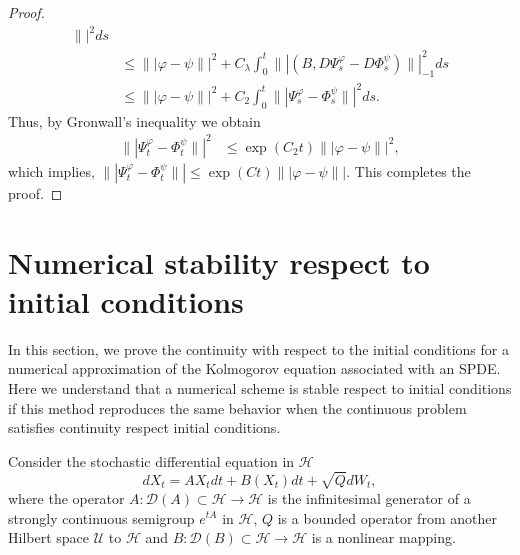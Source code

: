 \documentclass[]{interact}
\theoremstyle{plain}%
\theoremstyle{definition}
\theoremstyle{remark}
\begin{document}
\begin{proof}
\begin{align*}
            \| |^2ds
            \\
            &\le  
            \||
                \varphi - \psi
            \||^2
            + C_\lambda
            \int_0^t  
            \||
                (B,D\Psi_s^\varphi-D\Phi_s^\psi) 
            \||_{-1}^2 ds
        \\
            &\le  
            \||\varphi - \psi\||^2
            + C_2
            \int_0^t  
                \||
                    \Psi_s^\varphi-\Phi_s^\psi
                \||^2 ds.
        \end{align*}
        Thus, by Gronwall's inequality we obtain
        \begin{align}\label{s2.23}
            \||
                \Psi_t^\varphi-\Phi_t^\psi
            \||^2
            &\le 
            \exp(C_2t)  
            \|| \varphi - \psi \||^2, 
        \end{align}
        which implies,
        $
            \|| \Psi_t^\varphi-\Phi_t^\psi \||
            \le \exp(Ct)  \|| \varphi - \psi\||.
        $
        This completes the proof.
    \end{proof}

\section{Numerical stability respect to  initial conditions}
\label{sec:ContinuityRespectToInitialConditions}

        In this section, we prove the continuity with respect to the initial
    conditions for a numerical approximation of the Kolmogorov equation 
    associated with an SPDE. Here we understand that a  numerical scheme is 
    stable respect to initial conditions if this method reproduces the same 
    behavior when the continuous problem satisfies continuity respect initial 
    conditions.

    Consider the stochastic differential equation in $\mathcal{H}$
    \begin{equation}
        \label{P1s2.1}
         dX_t = AX_t dt + B(X_t) dt + \sqrt{Q}dW_t,
    \end{equation}
    where the operator 
    $
        A:\mathcal{D}(A)\subset \mathcal{H}\rightarrow
        \mathcal{H}
    $ is the infinitesimal generator of a strongly
    continuous semigroup $e^{tA}$ in $\mathcal{H}$, $Q$ is a bounded operator 
    from another Hilbert space $\mathcal{U}$ to $\mathcal{H}$
    and $B:\mathcal{D}(B)\subset \mathcal{H}\rightarrow \mathcal{H}$ is a
    nonlinear mapping.
\end{document}
